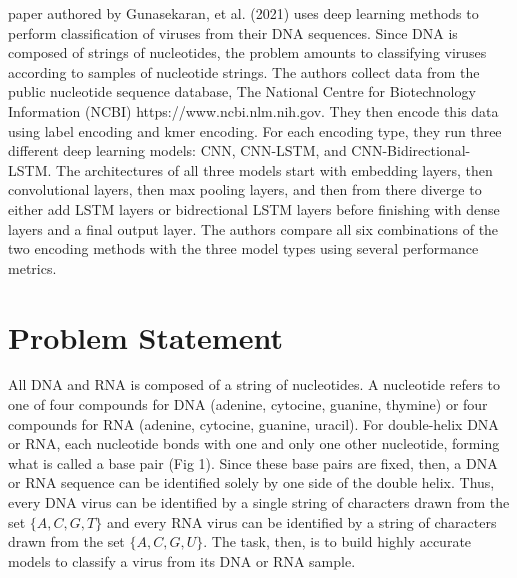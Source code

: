 \documentclass[journal]{IEEEtran}
\begin{document}
%
 paper authored by Gunasekaran, et al. (2021) uses deep learning methods 
to perform classification of viruses from their DNA sequences. Since DNA is composed of strings
of nucleotides, the problem amounts to classifying viruses according to samples of nucleotide
strings. The authors collect data from the public nucleotide sequence database,
The National Centre for Biotechnology Information (NCBI) https://www.ncbi.nlm.nih.gov.
They then encode this data using label encoding and kmer encoding. For each encoding type,
they run three different deep learning models: CNN, CNN-LSTM, and CNN-Bidirectional-LSTM.
The architectures of all three models start with embedding layers, then convolutional layers,
then max pooling layers, and then from there diverge to either add LSTM layers or 
bidrectional LSTM layers before finishing with dense layers and a final output layer.
The authors compare all six combinations of the two encoding methods with the three model types
using several performance metrics.

\section{Problem Statement}
All DNA and RNA is composed of a string of nucleotides. A nucleotide refers to one of
four compounds for DNA (adenine, cytocine, guanine, thymine) or four compounds for RNA
(adenine, cytocine, guanine, uracil). For double-helix DNA or RNA, each nucleotide
bonds with one and only one other nucleotide, forming what is called a base pair (Fig 1). Since
these base pairs are fixed, then, a DNA or RNA sequence can be identified solely by one
side of the double helix. Thus, every DNA virus can be identified by a single string of
characters drawn from the set $\{A, C, G, T\}$ and every RNA virus can be identified by a string
of characters drawn from the set $\{A, C, G, U\}$. The task, then, is to build highly accurate
models to classify a virus from its DNA or RNA sample.
\end{document}
